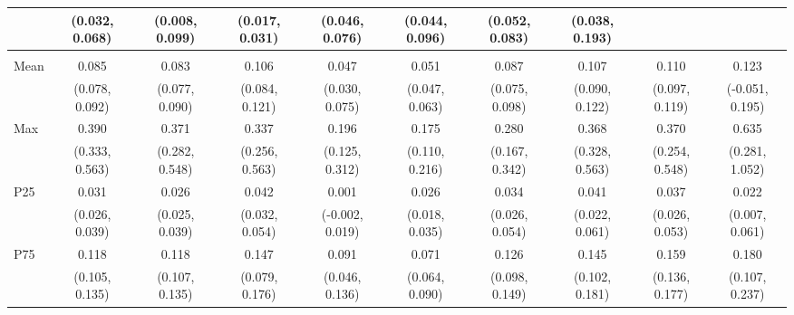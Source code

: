 {\begin{tabular}{l|c|c|c|c|c|c|c|c|c}
& {\scriptsize (0.032, 0.068)}
& {\scriptsize (0.008, 0.099)}
& {\scriptsize (0.017, 0.031)}
& {\scriptsize (0.046, 0.076)}
& {\scriptsize (0.044, 0.096)}
& {\scriptsize (0.052, 0.083)}
& {\scriptsize (0.038, 0.193)}
\\ [0.1cm]
\hline
\noalign{\smallskip}
\multicolumn{10}{l}{\textbf{Effect with Leads and Lags}} \\
\noalign{\smallskip}
\hline
Mean
& 0.085 & 0.083 & 0.106 & 0.047 & 0.051 & 0.087 & 0.107 & 0.110 & 0.123 \\
& {\scriptsize (0.078, 0.092)}
& {\scriptsize (0.077, 0.090)}
& {\scriptsize (0.084, 0.121)}
& {\scriptsize (0.030, 0.075)}
& {\scriptsize (0.047, 0.063)}
& {\scriptsize (0.075, 0.098)}
& {\scriptsize (0.090, 0.122)}
& {\scriptsize (0.097, 0.119)}
& {\scriptsize (-0.051, 0.195)}
\\ [0.1cm]
\hline
Max
& 0.390 & 0.371 & 0.337 & 0.196 & 0.175 & 0.280 & 0.368 & 0.370 & 0.635 \\
& {\scriptsize (0.333, 0.563)}
& {\scriptsize (0.282, 0.548)}
& {\scriptsize (0.256, 0.563)}
& {\scriptsize (0.125, 0.312)}
& {\scriptsize (0.110, 0.216)}
& {\scriptsize (0.167, 0.342)}
& {\scriptsize (0.328, 0.563)}
& {\scriptsize (0.254, 0.548)}
& {\scriptsize (0.281, 1.052)}
\\ [0.1cm]
\hline
P25
& 0.031 & 0.026 & 0.042 & 0.001 & 0.026 & 0.034 & 0.041 & 0.037 & 0.022 \\
& {\scriptsize (0.026, 0.039)}
& {\scriptsize (0.025, 0.039)}
& {\scriptsize (0.032, 0.054)}
& {\scriptsize (-0.002, 0.019)}
& {\scriptsize (0.018, 0.035)}
& {\scriptsize (0.026, 0.054)}
& {\scriptsize (0.022, 0.061)}
& {\scriptsize (0.026, 0.053)}
& {\scriptsize (0.007, 0.061)}
\\ [0.1cm]
\hline
P75
& 0.118 & 0.118 & 0.147 & 0.091 & 0.071 & 0.126 & 0.145 & 0.159 & 0.180 \\
& {\scriptsize (0.105, 0.135)}
& {\scriptsize (0.107, 0.135)}
& {\scriptsize (0.079, 0.176)}
& {\scriptsize (0.046, 0.136)}
& {\scriptsize (0.064, 0.090)}
& {\scriptsize (0.098, 0.149)}
& {\scriptsize (0.102, 0.181)}
& {\scriptsize (0.136, 0.177)}
& {\scriptsize (0.107, 0.237)}
\\ [0.1cm]
\hline
\hline
\end{tabular}
}
